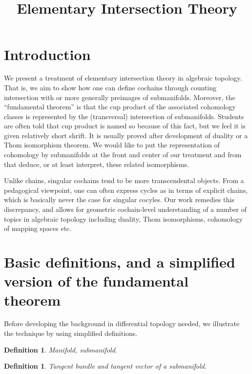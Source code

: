 \documentclass{amsart}          %
\newtheorem{definition}[theorem]{Definition}
\begin{document}
\title{Elementary Intersection Theory}
\maketitle

\section{Introduction}

We present a treatment of elementary intersection theory in algebraic topology.  
That is, we aim to show how one can  
define cochains through counting intersection with or more generally preimages of
submanifolds.  Moreover, the ``fundamental theorem''  is that the cup product of the associated
 cohomology classes is represented by the (transversal) intersection of submanifolds.  
 Students are often told that cup product is named so because of this 
 fact, but we feel it is given relatively short shrift.  It is usually proved after development of duality or a Thom isomorphism theorem.  
 We would like to put the representation of cohomology by submanifolds at the front and center of our treatment and from that deduce, 
 or at least interpret, these related isomorphisms.

Unlike chains, singular cochains tend to be more transcendental objects.  From a pedagogical  viewpoint, one can often express cycles as in terms of explicit chains, which is basically never the case for singular cocyles.  Our work remedies this discrepancy, and  allows for geometric cochain-level understanding of a number of topics in algebraic topology including duality, Thom isomorphisms, cohomology of mapping spaces
etc. 


\section{Basic definitions, and a simplified version of the fundamental theorem}

Before developing the background in differential topology needed, we illustrate the technique by using simplified definitions.

\begin{definition}
Manifold, submanifold.
\end{definition}

\begin{definition}
Tangent bundle and tangent vector of a submanifold.
\end{definition}
\end{document}
